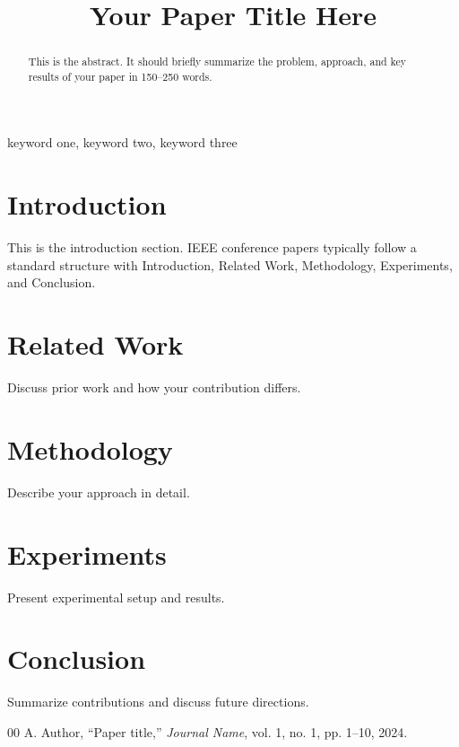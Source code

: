 \documentclass[conference]{IEEEtran}
\begin{document}
\title{Your Paper Title Here}

\author{
\and
{}
}

\maketitle

\begin{abstract}
This is the abstract. It should briefly summarize the problem, approach, and key results of your paper in 150--250 words.
\end{abstract}

\begin{IEEEkeywords}
keyword one, keyword two, keyword three
\end{IEEEkeywords}

\section{Introduction}

This is the introduction section. IEEE conference papers typically follow a standard structure with Introduction, Related Work, Methodology, Experiments, and Conclusion.

\section{Related Work}

Discuss prior work and how your contribution differs.

\section{Methodology}

Describe your approach in detail.

\section{Experiments}

Present experimental setup and results.

\section{Conclusion}

Summarize contributions and discuss future directions.

\begin{thebibliography}{00}
 A. Author, ``Paper title,'' \textit{Journal Name}, vol. 1, no. 1, pp. 1--10, 2024.
\end{thebibliography}
\end{document}
